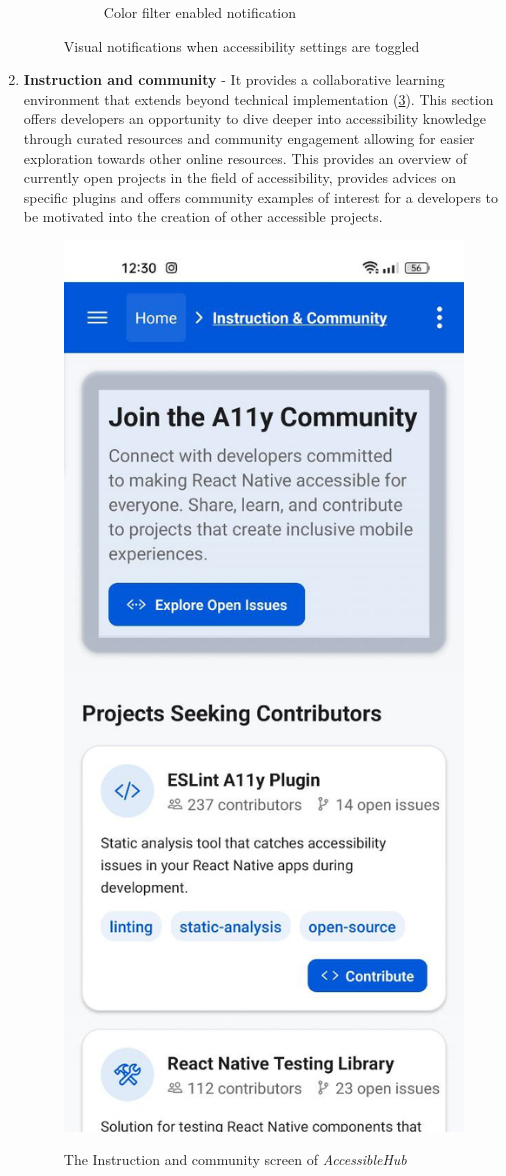 \begin{enumerate}
\begin{figure}[ht]
\begin{subfigure}[b]{0.48\textwidth}
        \caption{Color filter enabled notification}
        \label{fig:settings-filter-notification}
    \end{subfigure}
    \caption{Visual notifications when accessibility settings are toggled}
    \label{fig:settings_notifications}
\end{figure}

\pagebreak

\item \textbf{Instruction and community} - It provides a collaborative learning environment that extends beyond technical implementation (\ref{fig:instruction-community}). This section offers developers an opportunity to dive deeper into accessibility knowledge through curated resources and community engagement allowing for easier exploration towards other online resources. This provides an overview of currently open projects in the field of accessibility, provides advices on specific plugins and offers community examples of interest for a developers to be motivated into the creation of other accessible projects.

\begin{figure}[ht]
\centering
\includegraphics[width=0.4\linewidth, alt={Screenshot of the Instruction and community screen of AccessibleHub}]{img/instruction-community.jpg}
\caption{The Instruction and community screen of \textit{AccessibleHub}}\label{fig:instruction-community}
\end{figure}

\FloatBarrier
    
\end{enumerate}

